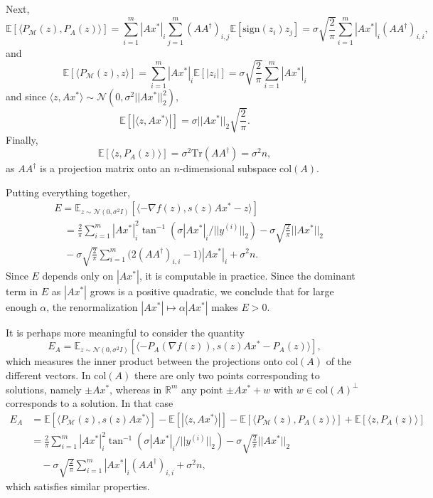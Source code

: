 \documentclass[12pt]{article}
\theoremstyle{definition}
\theoremstyle{remark}
\theoremstyle{definition}
\theoremstyle{problem}
\theoremstyle{definition}
\newcommand{\Tr}{\text{Tr}}
\newcommand{\col}{\text{col}}
\newcommand{\sign}{\text{sign}}
\newcommand{\atan}{\tan^{-1}}
\newcommand{\RR}{\mathbb{R} }
\newcommand{\MM}{\mathcal{M}}
\newcommand{\EE}{\mathbb{E}}
\begin{document}
Next,
\[ \EE[\langle P_{\MM}(z), P_A(z)\rangle] = \sum_{i=1}^m|Ax^*|_i\sum_{j=1}^m(AA^{\dagger})_{i,j}\EE[\sign(z_i)z_j] = \sigma\sqrt{\frac{2}{\pi}}\sum_{i=1}^m|Ax^*|_i(AA^{\dagger})_{i,i},\]
and
\[\EE\left[\langle P_{\MM}(z),z\rangle\right] = \sum_{i=1}^m|Ax^*|_i\EE[|z_i|] = \sigma\sqrt{\frac{2}{\pi}}\sum_{i=1}^m|Ax^*|_i\]
and since $\langle z,Ax^*\rangle\sim\mathcal{N}(0, \sigma^2||Ax^*||_2^2)$,
\[\EE[|\langle z,Ax^*\rangle|] = \sigma||Ax^*||_2\sqrt{\frac{2}{\pi}}.\]
Finally,
\[\EE[\langle z, P_A(z)\rangle] = \sigma^2\Tr(AA^{\dagger}) = \sigma^2n,\]
as $AA^{\dagger}$ is a projection matrix onto an $n$-dimensional subspace $\col(A)$.

Putting everything together,
\[\begin{aligned}&E=\EE_{z\sim \mathcal{N}(0,\sigma^2I)}\left[\langle -\nabla f(z), s(z)Ax^*-z\rangle\right]\\
&\quad= \frac{2}{\pi}\sum_{i=1}^m|Ax^*|_i^2\atan(\sigma|Ax^*|_i/||y^{(i)}||_2) - \sigma\sqrt{\frac{2}{\pi}}||Ax^*||_2\\
&\quad- \sigma\sqrt{\frac{2}{\pi}}\sum_{i=1}^m\Big(2(AA^{\dagger})_{i,i}-1\Big)|Ax^*|_i + \sigma^2n.\end{aligned}\]
Since $E$ depends only on $|Ax^*|$, it is computable in practice. Since the dominant term in $E$ as $|Ax^*|$ grows is a positive quadratic, we conclude that for large enough $\alpha$, the renormalization $|Ax^*|\mapsto \alpha|Ax^*|$ makes $E>0$.

It is perhaps more meaningful to consider the quantity
\[E_A = \EE_{z\sim \mathcal{N}(0,\sigma^2I)}\left[\langle -P_A(\nabla f(z)), s(z)Ax^*-P_A(z)\rangle\right],\]
which measures the inner product between the projections onto $\col(A)$ of the different vectors. In $\col(A)$ there are only two points corresponding to solutions, namely $\pm Ax^*$, whereas in $\RR^m$ any point $\pm Ax^* + w$ with $w\in\col(A)^{\perp}$ corresponds to a solution. In that case
\[\begin{aligned} E_A &= \EE[\langle P_{\MM}(z), s(z)Ax^*\rangle] - \EE[|\langle z,Ax^*\rangle|] - \EE[\langle P_{\MM}(z), P_A(z)\rangle] + \EE[\langle z,P_A(z)\rangle]\\
&= \frac{2}{\pi}\sum_{i=1}^m|Ax^*|_i^2\atan(\sigma|Ax^*|_i/||y^{(i)}||_2) - \sigma\sqrt{\frac{2}{\pi}}||Ax^*||_2\\
&\quad- \sigma\sqrt{\frac{2}{\pi}}\sum_{i=1}^m|Ax^*|_i(AA^{\dagger})_{i,i} + \sigma^2n,\end{aligned}\]
which satisfies similar properties.
\end{document}
